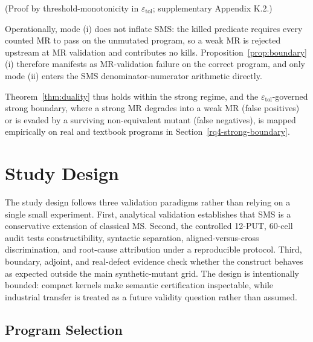 \documentclass[manuscript,screen,review]{acmart}
\begin{document}
(Proof by threshold-monotonicity in $\varepsilon_{\mathrm{tol}}$; supplementary
Appendix K.2.)

Operationally, mode (i) does not inflate SMS: the killed predicate
requires every counted MR to pass on the unmutated program, so a weak
MR is rejected upstream at MR validation and contributes no kills.
Proposition~\ref{prop:boundary}(i) therefore manifests as
MR-validation failure on the correct program, and only mode (ii)
enters the SMS denominator-numerator arithmetic directly.

Theorem~\ref{thm:duality} thus holds within the strong regime, and the
$\varepsilon_{\mathrm{tol}}$-governed strong boundary, where a strong
MR degrades into a weak MR (false positives) or is evaded by a surviving
non-equivalent mutant (false negatives), is mapped empirically on real
and textbook programs in Section~\ref{rq4-strong-boundary}.


\section{Study Design}\label{experimental-subjects-and-operator-framework}

The study design follows three validation paradigms rather than relying
on a single small experiment. First, analytical validation establishes
that SMS is a conservative extension of classical MS. Second, the
controlled 12-PUT, 60-cell audit tests constructibility, syntactic
separation, aligned-versus-cross discrimination, and root-cause
attribution under a reproducible protocol. Third, boundary, adjoint, and
real-defect evidence check whether the construct behaves as expected
outside the main synthetic-mutant grid. The design is intentionally
bounded: compact kernels make semantic certification inspectable, while
industrial transfer is treated as a future validity question rather than
assumed.

\subsection{Program Selection}\label{put-selection-12-puts-4-classes}
\end{document}
